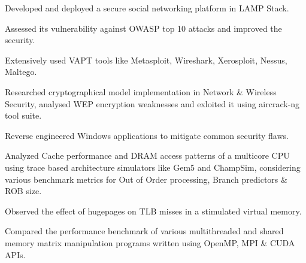 \documentclass[]{deedy-resume-openfont}
\begin{document}
\begin{minipage}[t]{0.70\textwidth}
\vspace{0.1cm}
\vspace{0cm} %
\begin{tightemize}
  \item Developed and deployed a secure social networking platform in LAMP Stack. 
  \item Assessed its vulnerability against OWASP top 10 attacks and improved the security.
  \item Extensively used VAPT tools like Metasploit, Wireshark, Xerosploit, Nessus, Maltego.
  \item	Researched cryptographical model implementation in Network \& Wireless Security, analysed WEP encryption weaknesses and exloited it using aircrack-ng tool suite.
  \item Reverse engineered Windows applications to mitigate common security flaws.
\end{tightemize}


\vspace{0.1cm}
\vspace{0cm} %
\begin{tightemize}
\item Analyzed Cache performance and DRAM access patterns of a multicore CPU using trace based architecture simulators like Gem5 and ChampSim, considering various benchmark metrics for Out of Order processing, Branch predictors \& ROB size.
  \item Observed the effect of hugepages on TLB misses in a stimulated virtual memory.
  \item Compared the performance benchmark of various multithreaded and shared memory matrix manipulation programs written using OpenMP, MPI \& CUDA APIs.
\end{tightemize}


\end{minipage}
\end{document}
